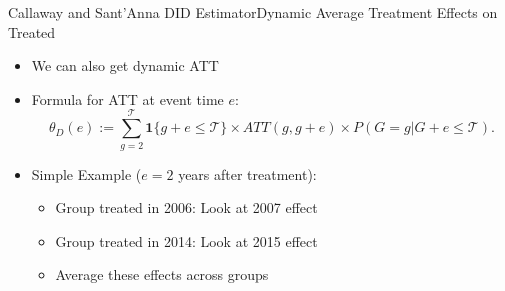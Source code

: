 \documentclass[dvipsnames,hyperref={pdfpagelabels=false}]{beamer}
\begin{document}
\begin{frame}{Callaway and Sant'Anna DID Estimator}{Dynamic Average Treatment Effects on Treated}
	\begin{itemize}
		\item[3] We can also get dynamic ATT
		\vspace{0.2cm}
		\item Formula for ATT at event time $e$:
		\begin{equation*}
		\theta_D(e) := \sum_{g=2}^{\mathcal{T}} \mathbf{1} \{ g + e \leq \mathcal{T} \} \times ATT(g,g+e) \times P(G=g | G+e \leq \mathcal{T}).
	\end{equation*}
		\item Simple Example ($e=2$ years after treatment):
		\vspace{0.2cm}
		\begin{itemize}
			\item Group treated in 2006: Look at 2007 effect
			\vspace{0.2cm}
			\item Group treated in 2014: Look at 2015 effect
			\vspace{0.2cm}
			\item Average these effects across groups
		\end{itemize}
		
	\end{itemize}
\end{frame}
\end{document}
